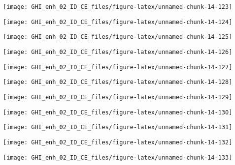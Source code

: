 \documentclass[
  10pt,
  a4paper,oneside]{article}
\begin{document}
\begin{center}\texttt{[image: GHI\_enh\_02\_ID\_CE\_files/figure-latex/unnamed-chunk-14-123]} \end{center}

\begin{center}\texttt{[image: GHI\_enh\_02\_ID\_CE\_files/figure-latex/unnamed-chunk-14-124]} \end{center}

\begin{center}\texttt{[image: GHI\_enh\_02\_ID\_CE\_files/figure-latex/unnamed-chunk-14-125]} \end{center}

\begin{center}\texttt{[image: GHI\_enh\_02\_ID\_CE\_files/figure-latex/unnamed-chunk-14-126]} \end{center}

\begin{center}\texttt{[image: GHI\_enh\_02\_ID\_CE\_files/figure-latex/unnamed-chunk-14-127]} \end{center}

\begin{center}\texttt{[image: GHI\_enh\_02\_ID\_CE\_files/figure-latex/unnamed-chunk-14-128]} \end{center}

\begin{center}\texttt{[image: GHI\_enh\_02\_ID\_CE\_files/figure-latex/unnamed-chunk-14-129]} \end{center}

\begin{center}\texttt{[image: GHI\_enh\_02\_ID\_CE\_files/figure-latex/unnamed-chunk-14-130]} \end{center}

\begin{center}\texttt{[image: GHI\_enh\_02\_ID\_CE\_files/figure-latex/unnamed-chunk-14-131]} \end{center}

\begin{center}\texttt{[image: GHI\_enh\_02\_ID\_CE\_files/figure-latex/unnamed-chunk-14-132]} \end{center}

\begin{center}\texttt{[image: GHI\_enh\_02\_ID\_CE\_files/figure-latex/unnamed-chunk-14-133]} \end{center}
\end{document}
